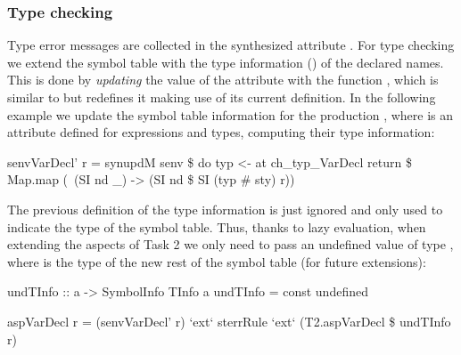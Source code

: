 \subsubsection{Type checking}

Type error messages are collected in the synthesized attribute .
For type checking we extend the symbol table with the type information () of the declared names.
This is done by \emph{updating} the value of the attribute  with the function , 
which is similar to  but redefines it making use of its current definition. 
In the following example we update the symbol table information for the production ,
where  is an attribute defined for expressions and types, computing their type information:
\begin{haskell}
senvVarDecl' r = synupdM senv \$ do 
        typ <- at ch_typ_VarDecl
        return \$ Map.map (\ (SI nd _) -> (SI nd \$ SI (typ # sty) r))
\end{haskell}
The previous definition of the type information is just ignored and only used to indicate the type of the symbol table.
Thus, thanks to lazy evaluation, when extending the aspects of Task 2 we only need to pass  an undefined value of type , 
where  is the type of the new rest of the symbol table (for future extensions):
\begin{haskell}
undTInfo :: a -> SymbolInfo TInfo a
undTInfo = const undefined

aspVarDecl r = (senvVarDecl' r) `ext` sterrRule `ext` 
               (T2.aspVarDecl \$ undTInfo r)
\end{haskell}

